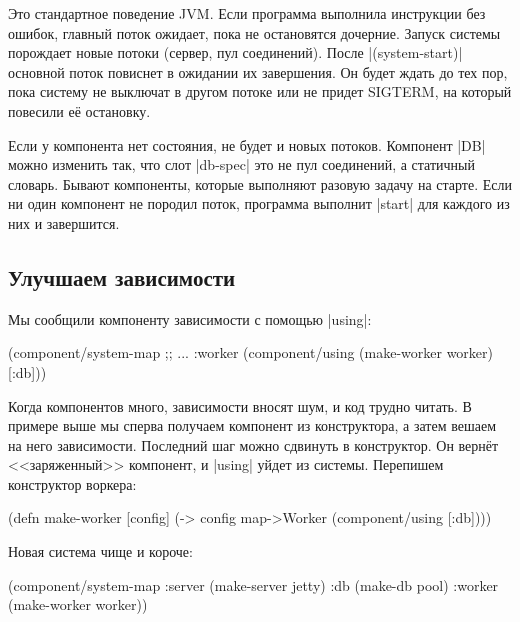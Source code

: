 Это стандартное поведение JVM. Если программа выполнила инструкции без ошибок,
главный поток ожидает, пока не остановятся дочерние. Запуск системы порождает
новые потоки (сервер, пул соединений). После \spverb|(system-start)| основной
поток повиснет в ожидании их завершения. Он будет ждать до тех пор, пока систему
не выключат в другом потоке или не придет SIGTERM, на который повесили е\"{е}
остановку.

Если у компонента нет состояния, не будет и новых потоков. Компонент \spverb|DB|
можно изменить так, что слот \spverb|db-spec| это не пул соединений, а статичный
словарь. Бывают компоненты, которые выполняют разовую задачу на старте. Если ни
один компонент не породил поток, программа выполнит \spverb|start| для каждого
из них и завершится.

\subsection{Улучшаем зависимости}

Мы сообщили компоненту зависимости с помощью \spverb|using|:

\begin{english}
  \begin{clojure}
(component/system-map
 ;; ...
 :worker (component/using
          (make-worker worker) [:db]))
  \end{clojure}
\end{english}

Когда компонентов много, зависимости вносят шум, и код трудно читать. В примере
выше мы сперва получаем компонент из конструктора, а затем вешаем на него
зависимости. Последний шаг можно сдвинуть в конструктор. Он верн\"{е}т
<<заряженный>> компонент, и \spverb|using| уйдет из системы. Перепишем
конструктор воркера:

\begin{english}
  \begin{clojure}
(defn make-worker [config]
  (-> config
      map->Worker
      (component/using [:db])))
  \end{clojure}
\end{english}

\noindent
Новая система чище и короче:

\begin{english}
  \begin{clojure}
(component/system-map
 :server (make-server jetty)
 :db     (make-db pool)
 :worker (make-worker worker))
  \end{clojure}
\end{english}

